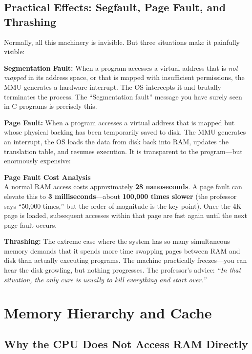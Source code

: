 \subsection{Practical Effects: Segfault, Page Fault, and Thrashing}

Normally, all this machinery is invisible. But three situations make it painfully visible:

\textbf{Segmentation Fault:} When a program accesses a virtual address that is \emph{not mapped} in its address space, or that is mapped with insufficient permissions, the MMU generates a hardware interrupt. The OS intercepts it and brutally terminates the process. The ``Segmentation fault'' message you have surely seen in C programs is precisely this.

\textbf{Page Fault:} When a program accesses a virtual address that is mapped but whose physical backing has been temporarily saved to disk. The MMU generates an interrupt, the OS loads the data from disk back into RAM, updates the translation table, and resumes execution. It is transparent to the program---but enormously expensive:

\begin{memoryblock}
\textbf{Page Fault Cost Analysis} \\
A normal RAM access costs approximately \textbf{28 nanoseconds}. A page fault can elevate this to \textbf{3 milliseconds}---about \textbf{100,000 times slower} (the professor says ``50,000 times,'' but the order of magnitude is the key point). Once the 4K page is loaded, subsequent accesses within that page are fast again until the next page fault occurs.
\end{memoryblock}

\textbf{Thrashing:} The extreme case where the system has so many simultaneous memory demands that it spends more time swapping pages between RAM and disk than actually executing programs. The machine practically freezes---you can hear the disk growling, but nothing progresses. The professor's advice: \emph{``In that situation, the only cure is usually to kill everything and start over.''}

\section{Memory Hierarchy and Cache}

\subsection{Why the CPU Does Not Access RAM Directly}

